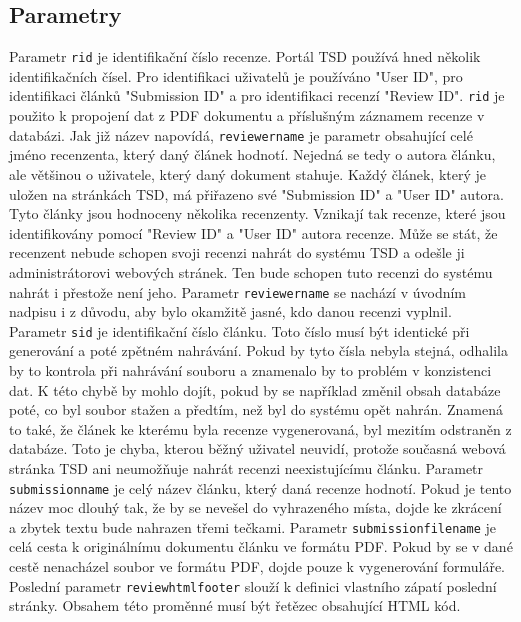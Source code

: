 \documentclass[czech,BP]{thesiskiv}
\begin{document}
\subsection{Parametry}
Parametr \texttt{rid} je identifikační číslo recenze. Portál TSD používá hned několik identifikačních čísel. Pro identifikaci uživatelů je používáno "User ID", pro identifikaci článků "Submission ID" a pro identifikaci recenzí "Review ID". \texttt{rid} je použito k propojení dat z PDF dokumentu a příslušným záznamem recenze v databázi. 
Jak již název napovídá, \texttt{reviewer\textunderscore name} je parametr obsahující celé jméno recenzenta, který daný článek hodnotí. Nejedná se tedy o autora článku, ale většinou o uživatele, který daný dokument stahuje. Každý článek, který je uložen na stránkách TSD, má přiřazeno své "Submission ID" a "User ID" autora. Tyto články jsou hodnoceny několika recenzenty. Vznikají tak recenze, které jsou identifikovány pomocí "Review ID" a "User ID" autora recenze. Může se stát, že recenzent nebude schopen svoji recenzi nahrát do systému TSD a odešle ji administrátorovi webových stránek. Ten bude schopen tuto recenzi do systému nahrát i přestože není jeho. Parametr \texttt{reviewer\textunderscore name} se nachází v úvodním nadpisu i z důvodu, aby bylo okamžitě jasné, kdo danou recenzi vyplnil.
Parametr \texttt{sid} je identifikační číslo článku. Toto číslo musí být identické při generování a poté zpětném nahrávání. Pokud by tyto čísla nebyla stejná, odhalila by to kontrola při nahrávání souboru a znamenalo by to problém v konzistenci dat. K této chybě by mohlo dojít, pokud by se například změnil obsah databáze poté, co byl soubor stažen a předtím, než byl do systému opět nahrán. Znamená to také, že článek ke kterému byla recenze vygenerovaná, byl mezitím odstraněn z databáze. Toto je chyba, kterou běžný uživatel neuvidí, protože současná webová stránka TSD ani neumožňuje nahrát recenzi neexistujícímu článku.  
Parametr \texttt{submission\textunderscore name} je celý název článku, který daná recenze hodnotí. Pokud je tento název moc dlouhý tak, že by se nevešel do vyhrazeného místa, dojde ke zkrácení a zbytek textu bude nahrazen třemi tečkami. 
Parametr \texttt{submission\textunderscore filename} je celá cesta k originálnímu dokumentu článku ve formátu PDF. Pokud by se v dané cestě nenacházel soubor ve formátu PDF, dojde pouze k vygenerování formuláře.
Poslední parametr \texttt{review\textunderscore html\textunderscore footer} slouží k definici vlastního zápatí poslední stránky. Obsahem této proměnné musí být řetězec obsahující HTML kód. 
\end{document}
